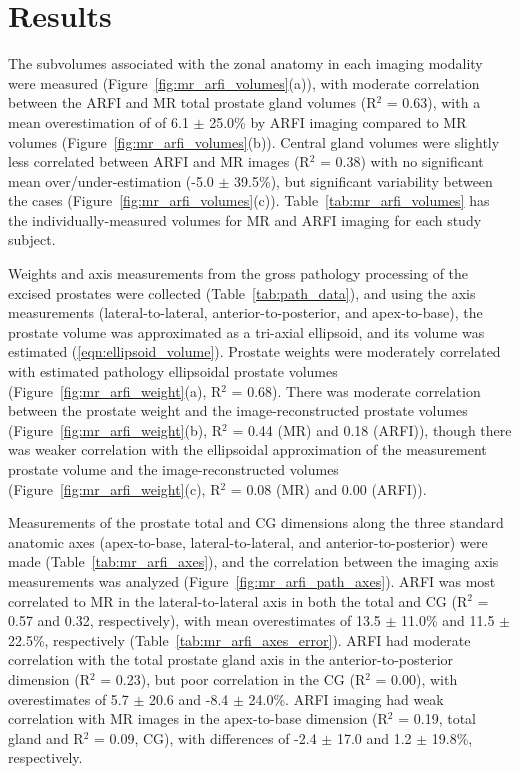 \section{Results}\label{sect:results}
The subvolumes associated with the zonal anatomy in each imaging modality were
measured (Figure~\ref{fig:mr_arfi_volumes}(a)), with moderate correlation
between the ARFI and MR total prostate gland volumes (R$^2$ = 0.63), with a
mean overestimation of of 6.1 $\pm$ 25.0\% by ARFI imaging compared to MR
volumes (Figure~\ref{fig:mr_arfi_volumes}(b)).  Central gland volumes were
slightly less correlated between ARFI and MR images (R$^2$ = 0.38) with no
significant mean over/under-estimation (-5.0 $\pm$ 39.5\%), but significant
variability between the cases (Figure~\ref{fig:mr_arfi_volumes}(c)).
Table~\ref{tab:mr_arfi_volumes} has the individually-measured volumes for MR
and ARFI imaging for each study subject.



Weights and axis measurements from the gross pathology processing of the
excised prostates were collected (Table~\ref{tab:path_data}), and using the
axis measurements (lateral-to-lateral, anterior-to-posterior, and
apex-to-base), the prostate volume was approximated as a tri-axial ellipsoid,
and its volume was estimated (\ref{eqn:ellipsoid_volume}).  Prostate weights
were moderately correlated with estimated pathology ellipsoidal prostate
volumes (Figure~\ref{fig:mr_arfi_weight}(a), R$^2$ = 0.68).  There was moderate
correlation between the prostate weight and the image-reconstructed prostate
volumes (Figure~\ref{fig:mr_arfi_weight}(b), R$^2$ = 0.44 (MR) and 0.18
(ARFI)), though there was weaker correlation with the ellipsoidal approximation
of the measurement prostate volume and the image-reconstructed volumes
(Figure~\ref{fig:mr_arfi_weight}(c), R$^2$ = 0.08 (MR) and 0.00 (ARFI)).  



Measurements of the prostate total and CG dimensions along the three
standard anatomic axes (apex-to-base, lateral-to-lateral, and
anterior-to-posterior) were made (Table~\ref{tab:mr_arfi_axes}), and the
correlation between the imaging axis measurements was analyzed
(Figure~\ref{fig:mr_arfi_path_axes}).  ARFI was most correlated to MR in the
lateral-to-lateral axis in both the total and CG (R$^2$ = 0.57 and
0.32, respectively), with mean overestimates of 13.5 $\pm$ 11.0\% and 11.5 $\pm$
22.5\%, respectively (Table~\ref{tab:mr_arfi_axes_error}).  ARFI had moderate
correlation with the total prostate gland axis in the anterior-to-posterior
dimension (R$^2$ = 0.23), but poor correlation in the CG (R$^2$ =
0.00), with overestimates of 5.7 $\pm$ 20.6 and -8.4 $\pm$ 24.0\%.  ARFI
imaging had weak correlation with MR images in the apex-to-base dimension
(R$^2$ = 0.19, total gland and R$^2$ = 0.09, CG), with differences
of -2.4 $\pm$ 17.0 and 1.2 $\pm$ 19.8\%, respectively.





%

%

%
